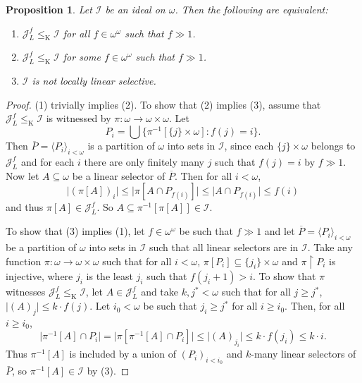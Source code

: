 \documentclass[a4paper,12pt]{amsart}
\newtheorem{prop}[thm]{Proposition}
\theoremstyle{definition}
\numberwithin{thm}{section}
\numberwithin{equation}{section}
\newcommand{\on}{\mathpunct{\upharpoonright}}
\newcommand{\I}{\mathscr{I}}
\newcommand{\J}{\mathscr{J}}
\renewcommand{\subset}{\subseteq}
\begin{document}
    \begin{prop}\label{prop:chara_JL}
        Let $\I$ be an ideal on $\omega$. Then the following are equivalent:
        \begin{enumerate}
            \item $\J_L^f \leq_{\mathrm{K}} \I$ for all $f\in\omega^\omega$ such that $f\gg 1$.
            \item $\J_L^f \leq_{\mathrm{K}} \I$ for some $f\in\omega^\omega$ such that $f\gg 1$.
            \item $\I$ is not locally linear selective.
        \end{enumerate}
    \end{prop}
    \begin{proof}
        (1) trivially implies (2). To show that (2) implies (3), assume that $\J_L^f \leq_{\mathrm{K}} \I$ is witnessed by $\pi\colon\omega\to\omega\times\omega$. Let
        \[
        P_i = \bigcup\{\pi^{-1}[\{j\}\times\omega]: f(j) = i\}.
        \]
        Then $\overline{P} = \langle P_i\rangle_{i<\omega}$ is a partition of $\omega$ into sets in $\I$, since each $\{j\}\times\omega$ belongs to $\J_L^f$ and for each $i$ there are only finitely many $j$ such that $f(j)=i$ by $f\gg1$. Now let $A\subset\omega$ be a linear selector of $\overline{P}$. Then for all $i<\omega$,
        \[
        \lvert (\pi[A])_i \rvert \leq \lvert \pi[A\cap P_{f(i)}]\rvert \leq \lvert A\cap P_{f(i)}\rvert \leq f(i)
        \]
        and thus $\pi[A]\in\J_L^f$. So $A\subset \pi^{-1}[\pi[A]]\in\I$.

        To show that (3) implies (1), let $f\in\omega^\omega$ be such that $f\gg 1$ and let $\overline{P} = \langle P_i\rangle_{i<\omega}$ be a partition of $\omega$ into sets in $\I$ such that all linear selectors are in $\I$. Take any function $\pi\colon\omega\to\omega\times\omega$ such that for all $i<\omega$, $\pi[P_i]\subset\{j_i\}\times\omega$ and $\pi\on P_i$ is injective, where $j_i$ is the least $j_i$ such that  $f(j_i +1) > i$.
        To show that $\pi$ witnesses $\J_L^f \leq_{\mathrm{K}} \I$, let $A\in\J_L^f$ 
        and take $k,j^*<\omega$ such that for all $j\geq j^*$,
        $\lvert (A)_{j}\rvert \leq k\cdot f(j)$.
        Let $i_0<\omega$ be such that $j_i\geq j^*$ for all $i\geq i_0$. Then, for all $i\geq i_0$,
        \[
        \lvert \pi^{-1}[A]\cap P_i\rvert = \lvert \pi[\pi^{-1}[A]\cap P_i]\rvert \leq \lvert (A)_{j_i}\rvert \leq k\cdot f(j_i) \leq k\cdot i.
        \]
        Thus $\pi^{-1}[A]$ is included by a union of $(P_i)_{i<i_0}$ and $k$-many linear selectors of $\bar{P}$, so $\pi^{-1}[A]\in\I$ by (3).
    \end{proof}
    
\end{document}
